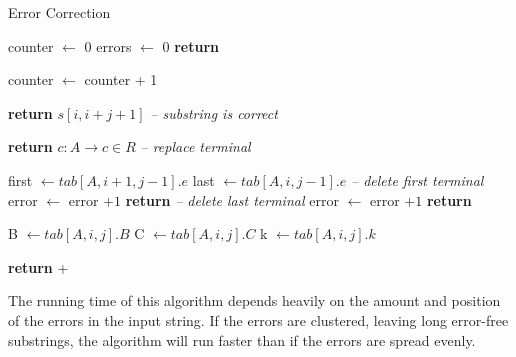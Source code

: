 \begin{algorithm}[H]
    \caption{Error Correction}
    \label{alg:ec}
    \begin{algorithmic}[1]
        \State counter $\leftarrow$ 0
        \State errors $\leftarrow$ 0
        \State \textbf{return} 
        \EndFunction

            \State counter $\leftarrow$ counter + 1

                \State \textbf{return} $s[i, i + j + 1]$ \hspace*{2.8cm}\textit{-- substring is correct} \label{lst:ec_correct}
            \EndIf
            \State

                \State \textbf{return} $c:A\rightarrow c\in R$ \hspace*{2.7cm}\textit{-- replace terminal} \label{lst:ec_replace}
            \EndIf
            \State

            \State first $\leftarrow tab[A,i+1,j-1].e$ \label{lst:ec_first}
            \State last $\leftarrow tab[A,i,j-1].e$ \label{lst:ec_last}
                 \hspace*{1.3cm}\textit{-- delete first terminal} \label{lst:ec_first_delete}
                    \State error $\leftarrow$ error $+ 1$ 
                    \State \textbf{return} 
                \EndIf
            \Else
                 \hspace*{1.3cm}\textit{-- delete last terminal} \label{lst:ec_last_delete}
                    \State error $\leftarrow$ error $+ 1$ 
                    \State \textbf{return} 
                \EndIf
            \EndIf
            \State

            \State B $\leftarrow tab[A,i,j].B$
            \State C $\leftarrow tab[A,i,j].C$
            \State k $\leftarrow tab[A,i,j].k$

            \State \textbf{return}  +  \label{lst:ec_return}
        \EndFunction
    \end{algorithmic}
\end{algorithm}

The running time of this algorithm depends heavily on the amount and position of the errors in the input string.
If the errors are clustered, leaving long error-free substrings, the algorithm will run faster than if the errors are spread evenly.

